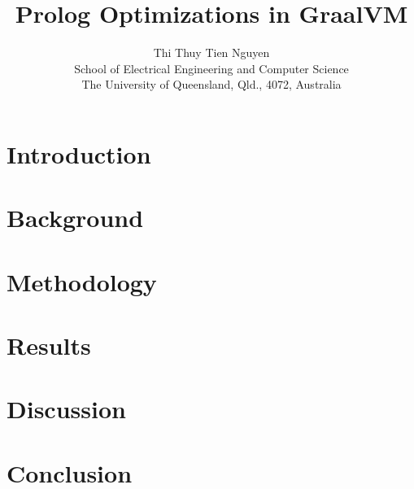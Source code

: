 \documentclass[conference]{IEEEtran}
\title{\textbf{\fontsize{14pt}{14pt}\selectfont Prolog Optimizations in GraalVM}}
\author{
    {\fontsize{12pt}{12pt}\selectfont Thi Thuy Tien Nguyen}\\
    {\fontsize{12pt}{12pt}\selectfont School of Electrical Engineering and Computer Science}\\
    {\fontsize{12pt}{12pt}\selectfont The University of Queensland, Qld., 4072, Australia}\\
}
\begin{document}
\maketitle

\begin{abstract}
\end{abstract}
\bigbreak
{
    \begin{spacing}{1.2}
        \it\fontsize{11pt}{11pt}\selectfont\setlength{\parindent}{5mm}\justifying
        
    \end{spacing}
}

\smallbreak
\smallbreak
\section{Introduction}
{
    \bigbreak
    \begin{spacing}{1.1}
        \fontsize{10pt}{10pt}\selectfont\setlength{\parindent}{5mm}\justifying
        
    \end{spacing}
}

\section{Background}
{
    \bigbreak
    \begin{spacing}{1.1}
        \fontsize{10pt}{10pt}\selectfont\setlength{\parindent}{5mm}\justifying
        
    \end{spacing}
}

\section{Methodology}
{
    \bigbreak
    \begin{spacing}{1.1}
        \fontsize{10pt}{10pt}\selectfont\setlength{\parindent}{5mm}\justifying
        
    \end{spacing}
}

\section{Results}
{
    \begin{spacing}{1.1}
        \fontsize{10pt}{10pt}\selectfont\setlength{\parindent}{5mm}\justifying
        
    \end{spacing}
}

\section{Discussion}
{
    \bigbreak
    \begin{spacing}{1.1}
        \fontsize{10pt}{10pt}\selectfont\setlength{\parindent}{5mm}\justifying
        
    \end{spacing}
}

\section{Conclusion}
{
    \bigbreak
    \begin{spacing}{1.1}
        \fontsize{10pt}{10pt}\selectfont\setlength{\parindent}{5mm}\justifying
        
    \end{spacing}
}




% 
\end{document}
